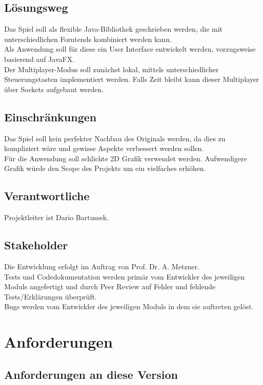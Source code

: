 \documentclass[12pt]{article}
\begin{document}
\subsection{Lösungsweg}
Das Spiel soll als flexible Java-Bibliothek geschrieben werden, die mit unterschiedlichen Forntends kombiniert werden kann. \\
Als Anwendung soll für diese ein User Interface entwickelt werden, vorzugsweise basierend auf JavaFX. \\
Der Multiplayer-Modus soll zunächst lokal, mittels unterschiedlicher Steuerungstasten implementiert werden.
Falls Zeit bleibt kann dieser Multiplayer über Sockets aufgebaut werden.

\subsection{Einschränkungen}
Das Spiel soll kein perfekter Nachbau des Originals werden, da dies zu kompliziert wäre und gewisse Aspekte verbessert werden sollen. \\
Für die Anwendung soll schlichte 2D Grafik verwendet werden. Aufwendigere Grafik würde den Scope des Projekts um ein vielfaches erhöhen.

\subsection{Verantwortliche}
Projektleiter ist Dario Bartussek.


\subsection{Stakeholder}
Die Entwicklung erfolgt im Auftrag von Prof. Dr. A. Metzner. \\
Tests und Codedokumentation werden primär vom Entwickler des jeweiligen Moduls angefertigt und durch Peer Review auf Fehler und fehlende Tests/Erklärungen überprüft. \\
Bugs werden vom Entwickler des jeweiligen Moduls in dem sie auftreten gelöst. \\

\newpage

\section{Anforderungen}

\subsection{Anforderungen an diese Version}
\end{document}
